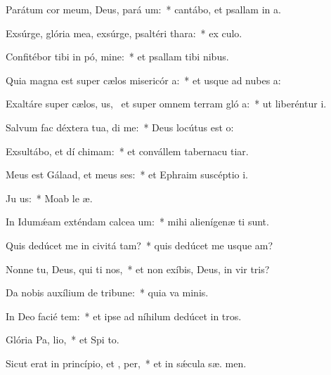 \item Parátum cor meum, Deus, pará  um:~* cantábo, et psallam in  a.
\item Exsúrge, glória mea, exsúrge, psaltéri  thara:~* ex culo.
\item Confitébor tibi in pó, mine:~* et psallam tibi  nibus.
\item Quia magna est super cælos misericór a:~* et usque ad nubes  a:
\item Exaltáre super cælos, us,~\pscross{} et super omnem terram gló a:~* ut liberéntur  i.
\item Salvum fac déxtera tua,  di me:~* Deus locútus est   o:
\item Exsultábo, et dí chimam:~* et convállem tabernacu tiar.
\item Meus est Gálaad, et meus  ses:~* et Ephraim suscéptio  i.
\item Ju  us:~* Moab le  æ.
\item In Idumǽam exténdam calcea um:~* mihi alienígenæ  ti sunt.
\item Quis dedúcet me in civitá tam?~* quis dedúcet me usque  am?
\item Nonne tu, Deus, qui ti nos,~* et non exíbis, Deus, in vir tris?
\item Da nobis auxílium de tribune:~* quia va  minis.
\item In Deo facié tem:~* et ipse ad níhilum dedúcet in tros.
\item Glória Pa,  lio,~* et Spi to.
\item Sicut erat in princípio, et ,  per,~* et in sǽcula sæ. men.
